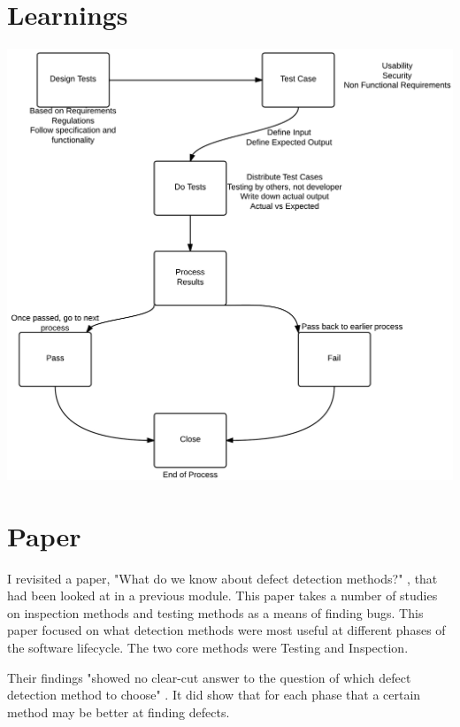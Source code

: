 \section{Learnings}
\begin{center}
\includegraphics[scale=0.24]{testing.png}
\end{center}

\section{Paper}

I revisited a paper, "What do we know about defect detection methods?" \parencite{defect}, that had been looked at in a previous module. This paper takes a number of studies on inspection methods and testing methods as a means of finding bugs. This paper focused on what detection methods were most useful at different phases of the software lifecycle. The two core methods were Testing and Inspection. 

Their findings "showed no clear-cut answer to the question of which defect detection method to choose" \parencite{defect}. It did show that for each phase that a certain method may be better at finding defects.

